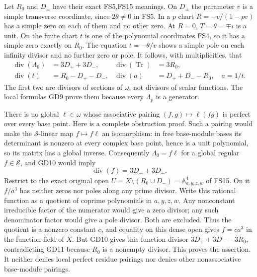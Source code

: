 Let $R_0$ and $D_\pm$ have their exact FS5,FS15 meanings.
On $D_\pm$ the parameter $v$ is a simple transverse
coordinate, since $2\theta\ne0$ in FS5. In a $p$ chart
$R=-v/(1-pv)$ has a simple zero on each of them and no
other zero. At $R=0$, $T=\theta=\mp i$ is a unit.
On the finite chart $t$ is one of the polynomial coordinates
FS4, so it has a simple zero exactly on $R_0$.
The equation $t=-\theta/v$ shows a simple pole on each
infinity divisor and no further zero or pole. It follows,
with multiplicities, that
\begin{equation}
\begin{aligned}
 \operatorname{div}(\Lambda_0)&=3D_++3D_-,&
 \operatorname{div}(\operatorname{Tr})&=3R_0,\\
 \operatorname{div}(t)&=R_0-D_+-D_-,&
 \operatorname{div}(a)&=D_++D_--R_0,\quad a=1/t.
\end{aligned}\tag{GD10}
\end{equation}
The first two are divisors of sections of $\omega$, not
divisors of scalar functions. The local formulas GD9
prove them because every $\Lambda_p$ is a generator.

There is no global $\ell\in\omega$ whose associative
pairing $(f,g)\mapsto\ell(fg)$ is perfect over every
base point. Here is a complete obstruction proof. Such
a pairing would make the $\mathscr S$-linear map
$f\mapsto f\ell$ an isomorphism: in free base-module
bases its determinant is nonzero at every complex base
point, hence is a unit polynomial, so its matrix has a
global inverse. Consequently $\Lambda_0=f\ell$ for a
global regular $f\in\mathscr S$, and GD10 would imply
\begin{equation}
 \operatorname{div}(f)=3D_++3D_-.
 \tag{GD11}
\end{equation}
Restrict to the exact original open
$U=X\setminus(R_0\cup D_-)=\mathbb A^4_{a,y,z,w}$
of FS15. On it $f/a^3$ has neither zeros nor poles
along any prime divisor. Write this rational function
as a quotient of coprime polynomials in $a,y,z,w$.
Any nonconstant irreducible factor of the numerator
would give a zero divisor; any such denominator factor
would give a pole divisor. Both are excluded. Thus the
quotient is a nonzero constant $c$, and equality on this
dense open gives $f=c a^3$ in the function field of $X$.
But GD10 gives this function divisor
$3D_++3D_--3R_0$, contradicting GD11 because $R_0$
is a nonempty divisor. This proves the assertion.
It neither denies local perfect residue pairings nor
denies other nonassociative base-module pairings.


